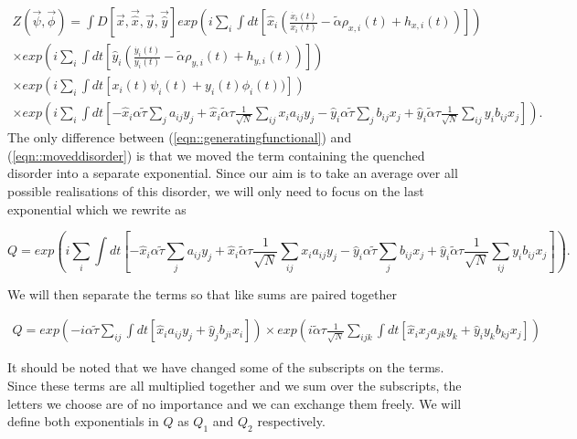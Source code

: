 \documentclass[.../main.tex]{subfiles}
\begin{document}
	\begin{equation}
	\begin{split}
	\label{eqn::moveddisorder}
		Z(\Vec{\psi}, \Vec{\phi}) = \int D[\Vec{x}, \Vec{\hat{x}}, \Vec{y}, \Vec{\hat{y}}] exp(i
		\sum_i \int dt[\hat{x}_i
		(\frac{\dot{x_i}(t)}{x_i(t)}
			- \tilde{\alpha} \rho_{x, i}(t)+ h_{x, i}(t))]) 
			\\
			\times exp(i \sum_i \int dt[\hat{y}_i
		(\frac{\dot{y_i}(t)}{y_i(t)} 
			- \tilde{\alpha} \rho_{y, i}(t) + h_{y, i}(t))])\\
			\times exp(i \sum_i
		\int dt[x_i(t) \psi_i(t) + y_i(t) \phi_i(t))])\\
		\times exp(i \sum_i \int dt[- \hat{x}_i \alpha \tilde{\tau} \sum_{j} a_
			{ij} 
			y_j +
			\hat{x}_i \tilde{\alpha} \tau \frac{1}{\sqrt{N}} \sum_{i j} x_i a_{ij} y_j - \hat{y}_i
			\alpha 
			\tilde{\tau} \sum_{j} b_
			{ij} 
			x_j +
			\hat{y}_i \tilde{\alpha} \tau \frac{1}{\sqrt{N}} \sum_{i j} y_i b_{ij} x_j]).
	\end{split}
	\end{equation}
	The only difference between (\ref{eqn::generatingfunctional}) and (\ref{eqn::moveddisorder}) is
	that we moved the term containing the quenched disorder into a separate exponential. Since our
	aim is to take an average over all possible realisations of this disorder, we will only need to
	focus on the last exponential which we rewrite as

	\begin{equation}
		Q = exp(i \sum_i \int dt[- \hat{x}_i \alpha \tilde{\tau} \sum_{j} a_
			{ij} 
			y_j +
			\hat{x}_i \tilde{\alpha} \tau \frac{1}{\sqrt{N}} \sum_{i j} x_i a_{ij} y_j - \hat{y}_i
			\alpha 
			\tilde{\tau} \sum_{j} b_
			{ij} 
			x_j +
			\hat{y}_i \tilde{\alpha} \tau \frac{1}{\sqrt{N}} \sum_{i j} y_i b_{ij} x_j]).
	\end{equation}

	We will then separate the terms so that like sums are paired together

	\begin{equation}
	\begin{split}
		Q = exp(-i \alpha \tilde{\tau} \sum_{ij} \int dt[\hat{x}_i a_{ij} y_j + \hat{y}_j b_
			{ji} 
			x_i])
			\times
			exp(i \tilde{\alpha} \tau \frac{1}{\sqrt{N}} \sum_{ijk} \int dt[\hat{x}_i x_j
			a_{jk} y_k + \hat{y}_i y_k b_{kj} x_j])
	\end{split}
	\end{equation}

	It should be noted that we have changed some of the subscripts on the terms. Since these terms
	are all multiplied together and we sum over the subscripts, the letters we choose are of no
	importance and we can exchange them freely. We will define both exponentials in $Q$ as $Q_1$ and
	$Q_2$ respectively.
\end{document}
